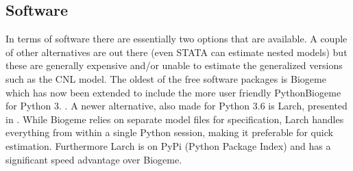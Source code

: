 \subsection{Software}
In terms of software there are essentially two options that are available. A couple of other alternatives are out there (even STATA can estimate nested models) but these are generally expensive and/or unable to estimate the generalized versions such as the CNL model. The oldest of the free software packages is Biogeme \citep{bierlaire_biogeme:_2003} which has now been extended to include the more user friendly PythonBiogeme for Python 3. \citep{bierlaire_pythonbiogeme:_2016}. A newer alternative, also made for Python 3.6 is Larch, presented in \citet{newman_computational_2018}. While Biogeme relies on separate model files for specification, Larch handles everything from within a single Python session, making it preferable for quick estimation. Furthermore Larch is on PyPi (Python Package Index) and has a significant speed advantage over Biogeme.
\\ \\
